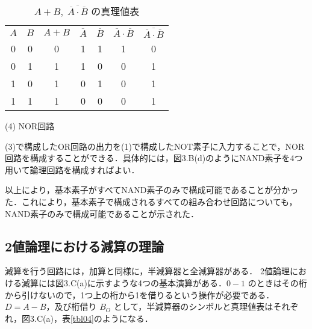 \newpage
\begin{table}[!h]
    \caption{$A + B,\; \overline{\overline{A} \cdot \overline{B}}$ の真理値表}
    \label{tbl03}
    \begin{center}
        \begin{tabular}{|c|c||c|c|c|c|c|}
            \hline
            $A$ & $B$ & $A + B$ & $\overline{A}$ & $\overline{B}$ & $\overline{A} \cdot \overline{B}$ & $\overline{\overline{A} \cdot \overline{B}}$ \\
            \hhline{|=|=#=|=|=|=|=|}
            0   & 0   & 0       & 1              & 1              & 1                                 & 0                                            \\
            \hline
            0   & 1   & 1       & 1              & 0              & 0                                 & 1                                            \\
            \hline
            1   & 0   & 1       & 0              & 1              & 0                                 & 1                                            \\
            \hline
            1   & 1   & 1       & 0              & 0              & 0                                 & 1                                            \\
            \hline
        \end{tabular}
    \end{center}
\end{table}

\vspace{7mm}
\noindent
(4) NOR回路 \vspace{2mm}

(3)で構成したOR回路の出力を(1)で構成したNOT素子に入力することで，NOR回路を構成することができる．具体的には，図3.B(d)のようにNAND素子を4つ用いて論理回路を構成すればよい．

\vspace{7mm}

以上により，基本素子がすべてNAND素子のみで構成可能であることが分かった．これにより，基本素子で構成されるすべての組み合わせ回路についても，NAND素子のみで構成可能であることが示された．

\subsection{2値論理における減算の理論}

減算を行う回路には，加算と同様に，半減算器と全減算器がある．
2値論理における減算には図3.C(a)に示すような4つの基本演算がある．$0 - 1$ のときはその桁から引けないので，1つ上の桁から1を借りるという操作が必要である．$D = A - B$，及び桁借り $B_O$ として，半減算器のシンボルと真理値表はそれぞれ，図3.C(a)，表\ref{tbl04}のようになる．

